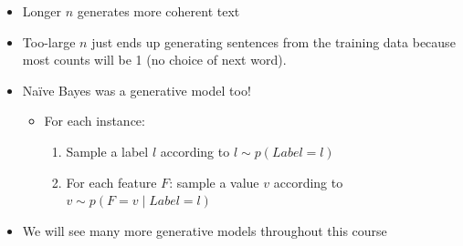 \documentclass[11pt,letterpaper]{article}
\begin{document}
\begin{itemize}
  \item Longer $n$ generates more coherent text
  \item Too-large $n$ just ends up generating sentences from the training data because most counts will be 1 (no choice of next word).

  \item Na\"{i}ve Bayes was a generative model too!
    \begin{itemize}
      \item[] \hspace{-4mm} For each instance:
        \begin{enumerate}
          \item Sample a label $l$ according to $l \sim p(Label=l)$          
          \item For each feature $F$: sample a value $v$ according to $v \sim p(F=v \mid Label=l)$
        \end{enumerate}
    \end{itemize}

  \item We will see many more generative models throughout this course
\end{itemize}
\end{document}
